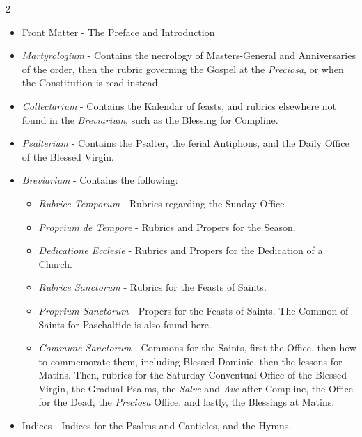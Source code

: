 \begin{multicols}{2}
\begin{itemize}[nosep,leftmargin=10pt]
	\item Front Matter - The Preface and Introduction
	\item \emph{Martyrologium} - Contains the necrology of Masters-General and Anniversaries of the order, then the rubric governing the Gospel at the \emph{Preciosa}, or when the Constitution is read instead.
	\item \emph{Collectarium} - Contains the Kalendar of feasts, and rubrics elsewhere not found in the \emph{Breviarium}, such as the Blessing for Compline.
	\item \emph{Psalterium} - Contains the Psalter, the ferial Antiphons, and the Daily Office of the Blessed Virgin.
	\item \emph{Breviarium} - Contains the following:
	\begin{itemize}[nosep,leftmargin=0pt]
		\item \emph{Rubrice Temporum} - Rubrics regarding the Sunday Office
		\item \emph{Proprium de Tempore} - Rubrics and Propers for the Season.
		\item \emph{Dedicatione Ecclesie} - Rubrics and Propers for the Dedication of a Church.
		\item \emph{Rubrice Sanctorum} - Rubrics for the Feasts of Saints.
		\item \emph{Proprium Sanctorum} - Propers for the Feasts of Saints. The Common of Saints for Paschaltide is also found here.
		\item \emph{Commune Sanctorum} - Commons for the Saints, first the Office, then how to commemorate them, including Blessed Dominic, then the lessons for Matins. Then, rubrics for the Saturday Conventual Office of the Blessed Virgin, the Gradual Psalms, the \emph{Salve} and \emph{Ave} after Compline, the Office for the Dead, the \emph{Preciosa} Office, and lastly, the Blessings at Matins.
		\end{itemize}
	\item Indices - Indices for the Psalms and Canticles, and the Hymns.
\end{itemize}

{\color{Red} }


\end{multicols}
